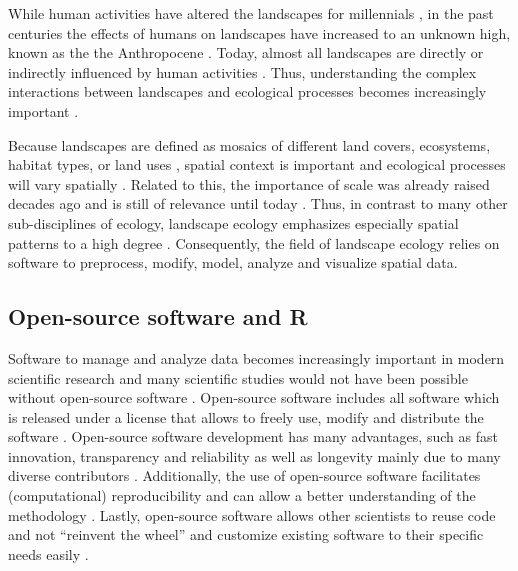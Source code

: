 \documentclass[smallextended]{svjour3}       %
\begin{document}
While human activities have altered the landscapes for millennials
\cite{Ellis2011,Ellis2015}, in the past centuries the effects of humans
on landscapes have increased to an unknown high, known as the the
Anthropocene \cite{Crutzen2002}. Today, almost all landscapes are
directly or indirectly influenced by human activities
\cite{Vitousek1997}. Thus, understanding the complex interactions
between landscapes and ecological processes becomes increasingly
important \cite{With2019}.

Because landscapes are defined as mosaics of different land covers,
ecosystems, habitat types, or land uses
\cite{Forman1986,Forman1995,Wiens1995}, spatial context is important and
ecological processes will vary spatially \cite{With2019}. Related to
this, the importance of scale was already raised decades ago
\cite{Wiens1989,Levin1992,Jelinski1996} and is still of relevance until
today \cite{Simova2012,Estes2018}. Thus, in contrast to many other
sub-disciplines of ecology, landscape ecology emphasizes especially
spatial patterns to a high degree \cite{Risser1984}. Consequently, the
field of landscape ecology relies on software to preprocess, modify,
model, analyze and visualize spatial data.

\hypertarget{sec:open_source}{%
\subsection{Open-source software and R}\label{sec:open_source}}

Software to manage and analyze data becomes increasingly important in
modern scientific research \cite{Wilson2014} and many scientific studies
would not have been possible without open-source software
\cite{Prlic2012}. Open-source software includes all software which is
released under a license that allows to freely use, modify and
distribute the software \cite{St.Laurent2008}. Open-source software
development has many advantages, such as fast innovation, transparency
and reliability as well as longevity mainly due to many diverse
contributors \cite{vonKrogh2006,St.Laurent2008}. Additionally, the use
of open-source software facilitates (computational) reproducibility and
can allow a better understanding of the methodology
\cite{Prlic2012,Powers2019}. Lastly, open-source software allows other
scientists to reuse code and not ``reinvent the wheel'' \cite{Prlic2012}
and customize existing software to their specific needs easily
\cite{Steiniger2009}.
\end{document}
